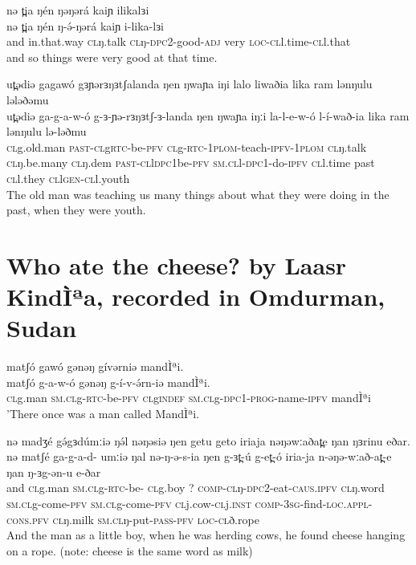 	\ex  	  nə t̪ia ŋén ŋəŋərá kaiɲ ilikalɜi  	 \\	
		\gll  nə t̪ia ŋén ŋ-ə́-ŋərá kaiɲ i-lika-lɜi  \\	
		 and in.that.way \textsc{cl}ŋ.talk \textsc{cl}ŋ-\textsc{dpc2}-good-\textsc{adj} very \textsc{loc-cl}l.time-\textsc{cl}l.that\\
		\glt and so things were very good at that time.

\ex  	  ut̪ədiə gagawó gɜɲərɜŋɜtʃalanda ŋen ŋwaɲa iŋi lalo liwaðia lika ram lənŋulu lələðəmu	 \\	
		\gll  ut̪ədiə ga-g-a-w-ó g-ɜ-ɲə-rɜŋɜtʃ-ɜ-landa ŋen ŋwaɲa iŋːi la-l-e-w-ó l-í-wað-ia lika ram lənŋulu lə-ləðmu \\	
		 \textsc{cl}g.old.man \textsc{past-cl}g\textsc{rtc}-be-\textsc{pfv} \textsc{cl}g-\textsc{rtc-1plom}-teach-\textsc{ipfv-1plom} \textsc{cl}ŋ.talk \textsc{cl}ŋ.be.many \textsc{cl}ŋ.{dem} \textsc{past-cl}l\textsc{dpc1}be-\textsc{pfv} \textsc{sm.cl}l-\textsc{dpc1}-do-\textsc{ipfv} \textsc{cl}l.time past \textsc{cl}l.they \textsc{cl}l\textsc{gen}-\textsc{cl}l.youth \\
		\glt The old man was teaching us many things about what they were doing in the past, when they were youth.\z 

\section{Who ate the cheese? by Laasr KindÌªa, recorded in Omdurman, Sudan}

\ea  	matʃó gawó gənəŋ gívərniə mandÌªi.\\ 	
		\gll  matʃó g-a-w-ó gənəŋ g-í-v-ə́rn-iə mandÌªi.\\	
		  \textsc{cl}g.man \textsc{sm.cl}g-\textsc{rtc}-be-\textsc{pfv} \textsc{cl}g\textsc{indef} \textsc{sm.cl}g-\textsc{dpc1-prog}-name-\textsc{ipfv} mandÌªi \\
		 \glt 'There once was a man called MandÌªi. 
		 
\ex  	nə madʒé gə́gɜdúmːiə ŋə́l nəŋəsiə ŋen getu geto iriaja nəŋəwːaðat̪e ŋan ŋɜrinu eðar.  \\ 
		\gll  nə matʃé ga-g-a-d- umːiə ŋal nə-ŋ-ə-s-ia ŋen g-ɜt̪-ú g-et̪-ó iria-ja n-əŋə-wːað-at̪-e ŋan ŋ-ɜg-ən-u e-ðar\\	
		  and \textsc{cl}g.man \textsc{sm.cl}g-\textsc{rtc}-be- \textsc{cl}g.boy ? \textsc{comp-cl}ŋ-\textsc{dpc2}-eat-\textsc{caus.ipfv} \textsc{cl}ŋ.word \textsc{sm.cl}g-come-\textsc{pfv} \textsc{sm.cl}g-come-\textsc{pfv} \textsc{cl}j.cow-\textsc{cl}j.\textsc{inst} \textsc{comp-3sg}-find-\textsc{loc.appl-cons.pfv} \textsc{cl}ŋ.milk \textsc{sm.cl}ŋ-put-\textsc{pass-pfv} \textsc{loc-cl}ð.rope    \\
		 \glt And the man as a little boy, when he was herding cows, he found cheese hanging on a rope. (note: cheese is the same word as milk)
		 
